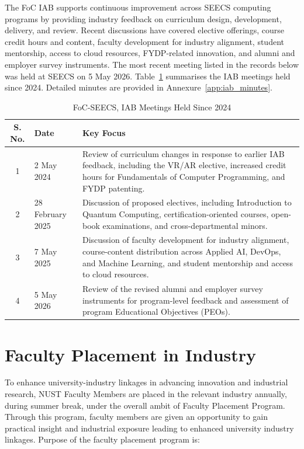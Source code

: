 The FoC IAB supports continuous improvement across SEECS computing programs by providing industry feedback on curriculum design, development, delivery, and review. Recent discussions have covered elective offerings, course credit hours and content, faculty development for industry alignment, student mentorship, access to cloud resources, FYDP-related innovation, and alumni and employer survey instruments. The most recent meeting listed in the records below was held at SEECS on 5 May 2026. Table~\ref{tab:iab_meetings} summarises the IAB meetings held since 2024. Detailed minutes are provided in Annexure~\ref{app:iab_minutes}.

\begin{table}[htbp]
\centering
\caption{FoC-SEECS, IAB Meetings Held Since 2024}
\label{tab:iab_meetings}
\begin{tabular}{|c|l|p{}|}
\hline
\textbf{S. No.} & \textbf{Date} & \textbf{Key Focus} \\
\hline
1 & 2 May 2024 & Review of curriculum changes in response to earlier IAB feedback, including the VR/AR elective, increased credit hours for Fundamentals of Computer Programming, and FYDP patenting. \\
\hline
2 & 28 February 2025 & Discussion of proposed electives, including Introduction to Quantum Computing, certification-oriented courses, open-book examinations, and cross-departmental minors. \\
\hline
3 & 7 May 2025 & Discussion of faculty development for industry alignment, course-content distribution across Applied AI, DevOps, and Machine Learning, and student mentorship and access to cloud resources. \\
\hline
4 & 5 May 2026 & Review of the revised alumni and employer survey instruments for program-level feedback and assessment of program Educational Objectives (PEOs). \\
\hline
\end{tabular}
\end{table}

\section{Faculty Placement in Industry}\label{sec:c9-faculty-placement}

To enhance university-industry linkages in advancing innovation and industrial research, NUST Faculty Members are placed in the relevant industry annually, during summer break, under the overall ambit of Faculty Placement Program. Through this program, faculty members are given an opportunity to gain practical insight and industrial exposure leading to enhanced university industry linkages. Purpose of the faculty placement program is:

